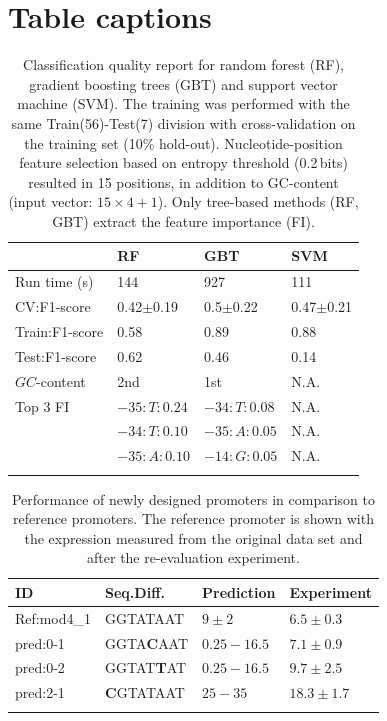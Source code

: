 \documentclass[utf8]{frontiersSCNS} %
\begin{document}
\section*{Table captions}
\begin{table}[h!]
    \caption{Classification quality report for random forest (RF), gradient boosting trees (GBT) and support vector machine (SVM). The training was performed with the same Train(56)-Test(7) division with cross-validation on the training set (10\% hold-out). Nucleotide-position feature selection based on entropy threshold (0.2\,bits) resulted in 15 positions, in addition to GC-content (input vector: $15\times4+1$). Only tree-based methods (RF, GBT) extract the feature importance (FI). \label{Tab:PputML}}
    {
    \begin{tabular}{@{}l|l|l|l@{}}
        \toprule
                        & RF           & GBT           & SVM \\\hline%
        Run time (s)    & 144           & 927           & 111 \\\hline
        CV:F1-score     & 0.42$\pm$0.19 & 0.5$\pm$0.22 & 0.47$\pm$0.21\\\hline
        Train:F1-score  & 0.58          & 0.89          & 0.88 \\\hline
        Test:F1-score   & 0.62          & 0.46          & 0.14 \\\hline
        $GC$-content    & 2nd           & 1st           & N.A.\\\hline
        Top 3 FI        & $-35:T:0.24$  & $-34:T:0.08$  & N.A.\\
                        & $-34:T:0.10$  & $-35:A:0.05$  & N.A.\\
                        & $-35:A:0.10$  & $-14:G:0.05$  & N.A.\\\botrule
    \end{tabular}
    }
    {} %
\end{table}

\newpage
\begin{table}[h!]
    \caption{Performance of newly designed promoters in comparison to reference promoters. The reference promoter is shown with the expression measured from the original data set and after the re-evaluation experiment. \label{Tab:PputNew}}
    {
    \begin{tabular}{@{}l|l|l|l@{}}
        \toprule
        ID              & Seq.Diff.     & Prediction     & Experiment \\\hline%
        Ref:mod4\_1      & GGTATAAT      & $9\pm2$       & $6.5\pm0.3$\\\hline
        pred:0-1        & GGTA\textbf{C}AAT      & $0.25-16.5$   & $7.1\pm0.9$\\
        pred:0-2        & GGTAT\textbf{T}AT      & $0.25-16.5$   & $9.7\pm2.5$\\\hline
        pred:2-1        & \textbf{C}GTATAAT      & $25-35$       & $18.3\pm1.7$\\
        \botrule
    \end{tabular}
    }
    {} %
\end{table}
\end{document}
